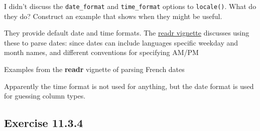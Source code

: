 \documentclass[]{book}
\newenvironment{Shaded}{\begin{snugshade}}{\end{snugshade}}
\newcommand{\CommentTok}[1]{\textcolor[rgb]{0.56,0.35,0.01}{\textit{#1}}}
\newcommand{\DataTypeTok}[1]{\textcolor[rgb]{0.13,0.29,0.53}{#1}}
\newcommand{\KeywordTok}[1]{\textcolor[rgb]{0.13,0.29,0.53}{\textbf{#1}}}
\newcommand{\NormalTok}[1]{#1}
\newcommand{\StringTok}[1]{\textcolor[rgb]{0.31,0.60,0.02}{#1}}
\theoremstyle{plain}
\theoremstyle{remark}
\theoremstyle{definition}
\theoremstyle{definition}
\theoremstyle{definition}
\theoremstyle{remark}
\begin{document}
I didn't discuss the \texttt{date\_format} and \texttt{time\_format}
options to \texttt{locale()}. What do they do? Construct an example that
shows when they might be useful.

They provide default date and time formats. The
\href{https://cran.r-project.org/web/packages/readr/vignettes/locales.html}{readr
vignette} discusses using these to parse dates: since dates can include
languages specific weekday and month names, and different conventions
for specifying AM/PM

\begin{Shaded}
\end{Shaded}

Examples from the \textbf{readr} vignette of parsing French dates

\begin{Shaded}
\end{Shaded}

Apparently the time format is not used for anything, but the date format
is used for guessing column types.

\hypertarget{exercise-11.3.4}{%
\subsection*{\texorpdfstring{Exercise
{11.3.4}}{Exercise 11.3.4}}\label{exercise-11.3.4}}
\end{document}
